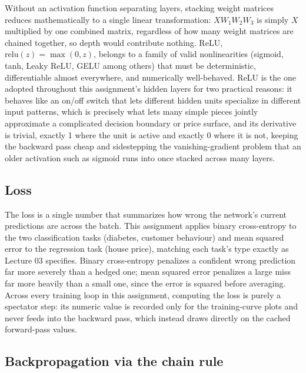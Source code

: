 \documentclass[11pt]{article}
\begin{document}
Without an activation function separating layers, stacking weight matrices reduces
mathematically to a single linear transformation: $X W_1 W_2 W_3$ is simply $X$ multiplied
by one combined matrix, regardless of how many weight matrices are chained together, so
depth would contribute nothing. ReLU, $\mathrm{relu}(z) = \max(0, z)$, belongs to a family
of valid nonlinearities (sigmoid, tanh, Leaky ReLU, GELU among others) that must be
deterministic, differentiable almost everywhere, and numerically well-behaved. ReLU is the
one adopted throughout this assignment's hidden layers for two practical reasons: it
behaves like an on/off switch that lets different hidden units specialize in different
input patterns, which is precisely what lets many simple pieces jointly approximate a
complicated decision boundary or price surface, and its derivative is trivial, exactly 1
where the unit is active and exactly 0 where it is not, keeping the backward pass cheap and
sidestepping the vanishing-gradient problem that an older activation such as sigmoid runs
into once stacked across many layers.

\subsection{Loss}

The loss is a single number that summarizes how wrong the network's current predictions are
across the batch. This assignment applies binary cross-entropy to the two classification
tasks (diabetes, customer behaviour) and mean squared error to the regression task (house
price), matching each task's type exactly as Lecture 03 specifies. Binary cross-entropy
penalizes a confident wrong prediction far more severely than a hedged one; mean squared
error penalizes a large miss far more heavily than a small one, since the error is squared
before averaging. Across every training loop in this assignment, computing the loss is
purely a spectator step: its numeric value is recorded only for the training-curve plots
and never feeds into the backward pass, which instead draws directly on the cached
forward-pass values.

\subsection{Backpropagation via the chain rule}
\end{document}
